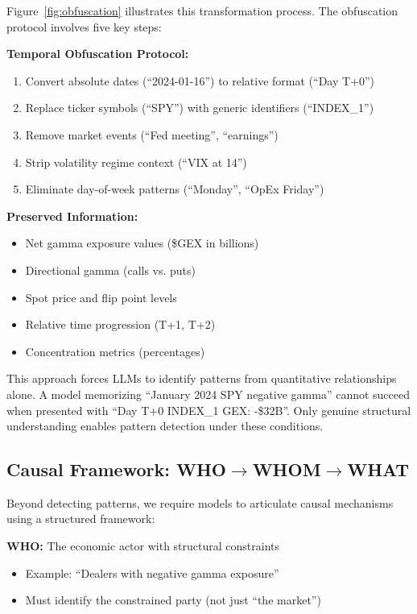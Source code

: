 Figure~\ref{fig:obfuscation} illustrates this transformation process. The obfuscation protocol involves five key steps:

\textbf{Temporal Obfuscation Protocol:}
\begin{enumerate}
\item Convert absolute dates (``2024-01-16'') to relative format (``Day T+0'')
\item Replace ticker symbols (``SPY'') with generic identifiers (``INDEX\_1'')
\item Remove market events (``Fed meeting'', ``earnings'')
\item Strip volatility regime context (``VIX at 14'')
\item Eliminate day-of-week patterns (``Monday'', ``OpEx Friday'')
\end{enumerate}

\textbf{Preserved Information:}
\begin{itemize}
\item Net gamma exposure values (\$GEX in billions)
\item Directional gamma (calls vs. puts)
\item Spot price and flip point levels
\item Relative time progression (T+1, T+2)
\item Concentration metrics (percentages)
\end{itemize}

This approach forces LLMs to identify patterns from quantitative relationships alone. A model memorizing ``January 2024 SPY negative gamma'' cannot succeed when presented with ``Day T+0 INDEX\_1 GEX: -\$32B''. Only genuine structural understanding enables pattern detection under these conditions.

\subsection{Causal Framework: \texorpdfstring{WHO$\rightarrow$WHOM$\rightarrow$WHAT}{WHO→WHOM→WHAT}}

Beyond detecting patterns, we require models to articulate causal mechanisms using a structured framework:

\textbf{WHO:} The economic actor with structural constraints
\begin{itemize}
\item Example: ``Dealers with negative gamma exposure''
\item Must identify the constrained party (not just ``the market'')
\end{itemize}

